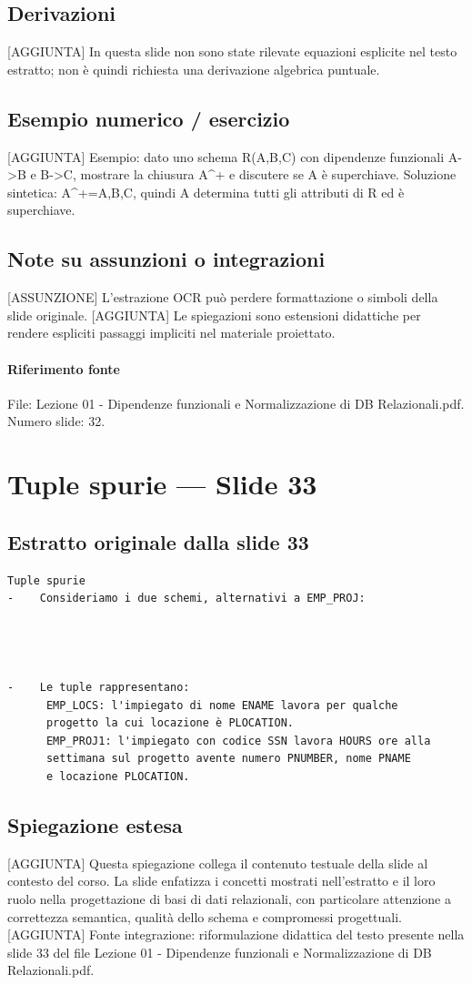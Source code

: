 \documentclass[11pt]{article}
\begin{document}
\subsection*{Derivazioni}
[AGGIUNTA] In questa slide non sono state rilevate equazioni esplicite nel testo estratto; non è quindi richiesta una derivazione algebrica puntuale.
\subsection*{Esempio numerico / esercizio}
[AGGIUNTA] Esempio: dato uno schema R(A,B,C) con dipendenze funzionali A->B e B->C, mostrare la chiusura A^+ e discutere se A è superchiave. Soluzione sintetica: A^+={A,B,C}, quindi A determina tutti gli attributi di R ed è superchiave.
\subsection*{Note su assunzioni o integrazioni}
[ASSUNZIONE] L'estrazione OCR può perdere formattazione o simboli della slide originale.
[AGGIUNTA] Le spiegazioni sono estensioni didattiche per rendere espliciti passaggi impliciti nel materiale proiettato.
\paragraph{Riferimento fonte} File: Lezione 01 - Dipendenze funzionali e Normalizzazione di DB Relazionali.pdf. Numero slide: 32.
\section{Tuple spurie --- Slide 33}
\subsection*{Estratto originale dalla slide 33}
\begin{lstlisting}
Tuple spurie
-    Consideriamo i due schemi, alternativi a EMP_PROJ:




-    Le tuple rappresentano:
      EMP_LOCS: l'impiegato di nome ENAME lavora per qualche
      progetto la cui locazione è PLOCATION.
      EMP_PROJ1: l'impiegato con codice SSN lavora HOURS ore alla
      settimana sul progetto avente numero PNUMBER, nome PNAME
      e locazione PLOCATION.
\end{lstlisting}
\subsection*{Spiegazione estesa}
[AGGIUNTA] Questa spiegazione collega il contenuto testuale della slide al contesto del corso. La slide enfatizza i concetti mostrati nell'estratto e il loro ruolo nella progettazione di basi di dati relazionali, con particolare attenzione a correttezza semantica, qualità dello schema e compromessi progettuali.
[AGGIUNTA] Fonte integrazione: riformulazione didattica del testo presente nella slide 33 del file Lezione 01 - Dipendenze funzionali e Normalizzazione di DB Relazionali.pdf.
\end{document}
